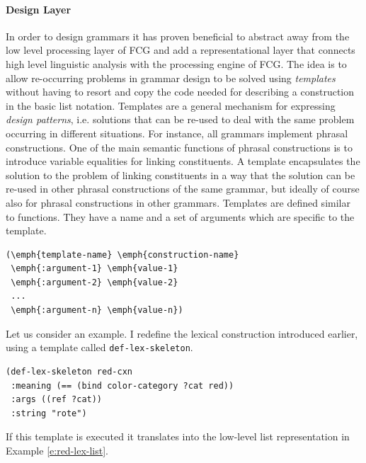 \paragraph*{Design Layer}
In order to design grammars it has proven beneficial
to abstract away from the low level processing layer of FCG and 
add a representational layer that connects high level linguistic 
analysis with the processing engine of FCG.
The idea is to allow re-occurring problems in grammar design
to be solved using \emph{templates} without having
to resort and copy the code needed for describing a construction
in the basic list notation. Templates 
are a general mechanism for expressing \emph{design patterns},
i.e. solutions that can be re-used to deal with the
same problem occurring in different situations. For instance,
all grammars implement phrasal constructions. One 
of the main semantic functions of phrasal constructions 
is to introduce variable equalities for linking constituents.
A template encapsulates the solution to the problem 
of linking constituents in a way that the solution can be re-used in other
phrasal constructions of the same grammar, but ideally of
course also for phrasal constructions in other grammars.
Templates are defined similar to functions. They
have a name and a set of arguments which are specific
to the template.
\begin{example}
\label{e:template-syntax}
\begin{footnotesize}
\begin{Verbatim}[commandchars=\\\{\}]
(\emph{template-name} \emph{construction-name}
 \emph{:argument-1} \emph{value-1}
 \emph{:argument-2} \emph{value-2}
 ...
 \emph{:argument-n} \emph{value-n})
\end{Verbatim}
\end{footnotesize}
\end{example}


Let us consider an example. I redefine the lexical construction introduced earlier,
using a template called 
{\footnotesize\tt def-lex-skeleton}.
\begin{example}
\label{e:def-lex-rot}
\begin{footnotesize}
\begin{Verbatim}[commandchars=\\\{\}]
(def-lex-skeleton red-cxn 
 :meaning (== (bind color-category ?cat red)) 
 :args ((ref ?cat))
 :string "rote")
\end{Verbatim}
\end{footnotesize}
\end{example}
If this template is executed it translates into the 
low-level list representation in Example \ref{e:red-lex-list}. 

